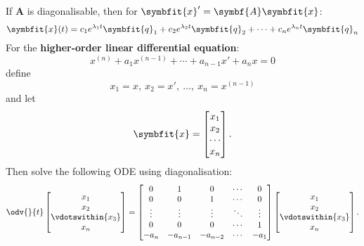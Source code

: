 \documentclass{article}
\begin{document}
\begin{multicols*}{2}
    If \(\symbf{A}\) is diagonalisable, then for \(\symbfit{x}' = \symbf{A} \symbfit{x}\):
    \begin{equation*}
        \symbfit{x}(t) = c_1 e^{\lambda_1 t} \symbfit{q}_1 + c_2 e^{\lambda_2 t} \symbfit{q}_2 + \cdots + c_n e^{\lambda_n t} \symbfit{q}_n
    \end{equation*}
    For the \textbf{higher-order linear differential equation}:
    \begin{equation*}
        x^{\left( n \right)} + a_1 x^{\left( n-1 \right)} + \cdots + a_{n-1} x' + a_n x = 0
    \end{equation*}
    define
    \begin{equation*}
        x_1 = x,\: x_2 = x',\: \dots,\: x_n = x^{\left( n-1 \right)}
    \end{equation*}
    and let
    \begin{equation*}
        \symbfit{x}=
        \begin{bmatrix}
            x_1 \\ x_2 \\ \cdots \\ x_n
        \end{bmatrix}.
    \end{equation*}
    Then solve the following ODE using diagonalisation:
    \begin{equation*}
        \odv{}{t}
        \begin{bmatrix}
            x_1               \\
            x_2               \\
            \vdotswithin{x_3} \\
            x_n
        \end{bmatrix}
        =
        \begin{bmatrix}
            0      & 1        & 0        & \cdots & 0      \\
            0      & 0        & 1        & \cdots & 0      \\
            \vdots & \vdots   & \vdots   & \ddots & \vdots \\
            0      & 0        & 0        & \cdots & 1      \\
            -a_n   & -a_{n-1} & -a_{n-2} & \cdots & -a_1
        \end{bmatrix}
        \begin{bmatrix}
            x_1               \\
            x_2               \\
            \vdotswithin{x_3} \\
            x_n
        \end{bmatrix}.
    \end{equation*}

\end{multicols*}
\end{document}
